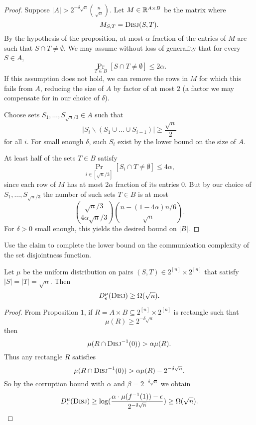 \begin{proof}
Suppose $|A| > 2^{-\delta\sqrt{n}}{n\choose\sqrt{n}}.$ Let $M \in \mathbb{R}^{A\times B}$ be the matrix where
$$M_{S,T} = \textsc{Disj}(S,T).$$
By the hypothesis of the proposition, at most $\alpha$ fraction of the entries of $M$ are such that $S\cap T \neq \emptyset$. We may assume without loss of generality that for every $S\in A$,
$$\Pr_{T \in B}[S\cap T \neq \emptyset] \leq 2\alpha.$$
If this assumption does not hold, we can remove the rows in $M$ for which this fails from $A$, reducing the size of $A$ by factor of at most $2$ (a factor we may compensate for in our choice of $\delta$).

Choose sets $S_1,\dots, S_{\sqrt{n}/3} \in A$ such that
$$|S_i\backslash (S_1\cup\dots\cup S_{i-1})| \geq \frac{\sqrt{n}}{2}$$
for all $i$. For small enough $\delta$, such $S_i$ exist by the lower bound on the size of $A$.

At least half of the sets $T \in B$ satisfy 
$$\Pr_{i \in [\sqrt{n}/3]}[ S_i\cap T \neq \emptyset] \leq 4\alpha,$$
since each row of $M$ has at most $2\alpha$ fraction of its entries $0$. But by our choice of $S_1,\dots, S_{\sqrt{n}/3}$ the number of such sets $T \in B$ is at most
$${\sqrt{n}/3\choose 4\alpha\sqrt{n}/3}{n-(1-4\alpha)n/6\choose \sqrt{n}}.$$
For $\delta>0$ small enough, this yields the desired bound on $|B|$.
\end{proof}

Use the claim to complete the lower bound on the communication complexity of the set disjointness function.

\begin{theorem}
Let $\mu$ be the uniform distribution on pairs $(S,T) \in 2^{[n]} \times 2^{[n]}$ that satisfy $|S| = |T| = \sqrt{n}$. Then
\[
D_\epsilon^{\mu}(\textsc{Disj}) \ge \Omega(\sqrt{n}).
\]
\end{theorem}

\begin{proof}
From Proposition $1$, if $R = A\times B \subseteq 2^{[n]}\times 2^{[n]}$ is rectangle such that
$$\mu(R) \geq 2^{-\delta\sqrt{n}}$$ then
$$\mu(R\cap \textsc{Disj}^{-1}(0)) > \alpha \mu(R).$$	
Thus any rectangle $R$ satisfies
$$\mu(R\cap \textsc{Disj}^{-1}(0)) > \alpha \mu(R) - 2^{-\delta\sqrt{n}}.$$
So by the corruption bound with $\alpha$ and $\beta = 2^{-\delta\sqrt{n}}$ we obtain
$$D^{\mu}_\epsilon(\textsc{Disj}) \geq \log(\frac{\alpha\cdot \mu(f^{-1}(1)) - \epsilon}{2^{-\delta\sqrt{n}}}) \geq \Omega(\sqrt{n}).$$\end{proof}

